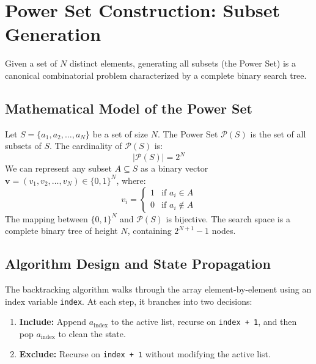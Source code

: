 \documentclass[10pt,journal,compsoc,onecolumn]{IEEEtran}
\begin{document}
\section{Power Set Construction: Subset Generation}
\label{sec:subsets}

Given a set of $N$ distinct elements, generating all subsets (the Power Set) is a canonical combinatorial problem characterized by a complete binary search tree.

\subsection{Mathematical Model of the Power Set}
Let $S = \{a_1, a_2, \ldots, a_N\}$ be a set of size $N$. The Power Set $\mathcal{P}(S)$ is the set of all subsets of $S$. The cardinality of $\mathcal{P}(S)$ is:
\begin{equation}
|\mathcal{P}(S)| = 2^N
\end{equation}
We can represent any subset $A \subseteq S$ as a binary vector $\mathbf{v} = (v_1, v_2, \ldots, v_N) \in \{0, 1\}^N$, where:
\begin{equation}
v_i = \begin{cases}
1 & \text{if } a_i \in A \\
0 & \text{if } a_i \notin A
\end{cases}
\end{equation}
The mapping between $\{0, 1\}^N$ and $\mathcal{P}(S)$ is bijective. The search space is a complete binary tree of height $N$, containing $2^{N+1}-1$ nodes.

\subsection{Algorithm Design and State Propagation}
The backtracking algorithm walks through the array element-by-element using an index variable \texttt{index}. At each step, it branches into two decisions:
\begin{enumerate}
    \item \textbf{Include:} Append $a_{\text{index}}$ to the active list, recurse on \texttt{index + 1}, and then pop $a_{\text{index}}$ to clean the state.
    \item \textbf{Exclude:} Recurse on \texttt{index + 1} without modifying the active list.
\end{enumerate}
\end{document}
